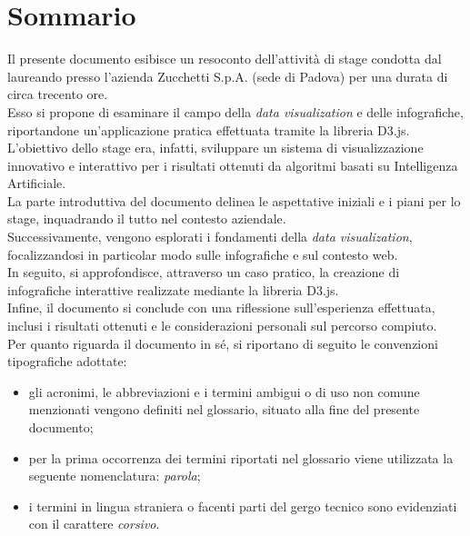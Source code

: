 \cleardoublepage
{}
{}
\begingroup
\let\clearpage\relax
\let\cleardoublepage\relax
\let\cleardoublepage\relax

\chapter*{Sommario}

Il presente documento esibisce un resoconto dell'attività di stage condotta dal laureando \myName \space presso 
l'azienda Zucchetti S.p.A. (sede di Padova) per una durata di circa trecento ore.\\

\noindent Esso si propone di esaminare il campo della \emph{data visualization} e delle infografiche, riportandone 
un'applicazione pratica effettuata tramite la libreria D3.js. 
L'obiettivo dello stage era, infatti, sviluppare un sistema di visualizzazione innovativo e interattivo 
per i risultati ottenuti da algoritmi basati su Intelligenza Artificiale.\\

\noindent La parte introduttiva del documento delinea le aspettative iniziali e i piani per lo stage, 
inquadrando il tutto nel contesto aziendale. \\
Successivamente, vengono esplorati i fondamenti della \emph{data visualization}, focalizzandosi in particolar modo 
sulle infografiche e sul contesto web.\\
In seguito, si approfondisce, attraverso un caso pratico, la creazione di infografiche interattive 
realizzate mediante la libreria D3.js.\\
Infine, il documento si conclude con una riflessione sull'esperienza effettuata, inclusi i risultati ottenuti 
e le considerazioni personali sul percorso compiuto.\\

\noindent Per quanto riguarda il documento in sé, si riportano di seguito le convenzioni tipografiche adottate:
\begin{itemize}
    \item gli acronimi, le abbreviazioni e i termini ambigui o di uso non comune menzionati vengono definiti nel glossario, situato alla fine del presente documento;
    \item per la prima occorrenza dei termini riportati nel glossario viene utilizzata la seguente nomenclatura: \emph{parola}\glsfirstoccur;
    \item i termini in lingua straniera o facenti parti del gergo tecnico sono evidenziati con il carattere \emph{corsivo}.
\end{itemize}





\endgroup

\vfill
